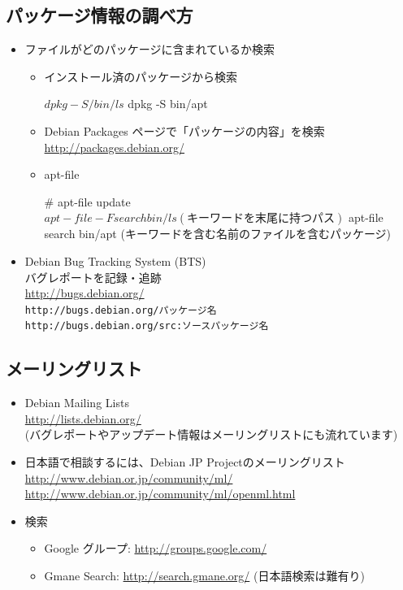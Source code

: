 \documentclass[mingoth,a4paper]{jsarticle}
\begin{document}
\subsection{パッケージ情報の調べ方}

\begin{itemize}
 \item ファイルがどのパッケージに含まれているか検索
       \begin{itemize}
	\item インストール済のパッケージから検索
\begin{commandline}
$ dpkg -S /bin/ls
$ dpkg -S bin/apt
\end{commandline}
 \item Debian Packages ページで「パッケージの内容」を検索\\
 \url{http://packages.debian.org/}
 \item apt-file
\begin{commandline}
# apt-file update
$ apt-file -F search bin/ls
  (キーワードを末尾に持つパス)
$ apt-file search bin/apt
  (キーワードを含む名前のファイルを含むパッケージ)
\end{commandline}
\end{itemize}

\item Debian Bug Tracking System (BTS)\\
バグレポートを記録・追跡\\
\url{http://bugs.debian.org/}\\
\verb|http://bugs.debian.org/パッケージ名|\\
\verb|http://bugs.debian.org/src:ソースパッケージ名|
\end{itemize}

\subsection{メーリングリスト}
\begin{itemize}
\item Debian Mailing Lists\\
\url{http://lists.debian.org/}\\
(バグレポートやアップデート情報はメーリングリストにも流れています)

\item 日本語で相談するには、Debian JP Projectのメーリングリスト\\
\url{http://www.debian.or.jp/community/ml/}\\
\url{http://www.debian.or.jp/community/ml/openml.html}

\item 検索
 \begin{itemize}
 \item Google グループ: \url{http://groups.google.com/}
 \item Gmane Search: \url{http://search.gmane.org/} (日本語検索は難有り)
 \end{itemize}
\end{itemize}
\end{document}
